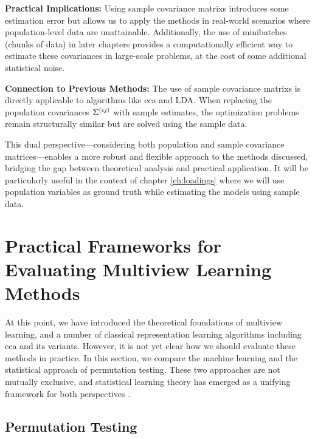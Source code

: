 \textbf{Practical Implications:} Using \glspl{sample covariance matrix} introduces some estimation error but allows us to apply the methods in real-world scenarios where population-level data are unattainable.
Additionally, the use of minibatches (chunks of data) in later chapters provides a computationally efficient way to estimate these covariances in large-scale problems, at the cost of some additional statistical noise.

\textbf{Connection to Previous Methods:} The use of \glspl{sample covariance matrix} is directly applicable to algorithms like \acrshort{cca} and LDA. When replacing the population covariances \(\Sigma^{(ij)}\) with sample estimates, the optimization problems remain structurally similar but are solved using the sample data.

This dual perspective—considering both population and sample covariance matrices—enables a more robust and flexible approach to the methods discussed, bridging the gap between theoretical analysis and practical application.
It will be particularly useful in the context of chapter \ref{ch:loadings} where we will use population variables as ground truth while estimating the models using sample data.


\section{Practical Frameworks for Evaluating Multiview Learning Methods}

At this point, we have introduced the theoretical foundations of multiview learning, and a number of classical representation learning algorithms including \acrshort{cca} and its variants.
However, it is not yet clear how we should evaluate these methods in practice.
In this section, we compare the machine learning and the statistical approach of permutation testing.
These two approaches are not mutually exclusive, and statistical learning theory has emerged as a unifying framework for both perspectives \citep{vapnik1999nature, hastie2009elements}.

\subsection{Permutation Testing}

